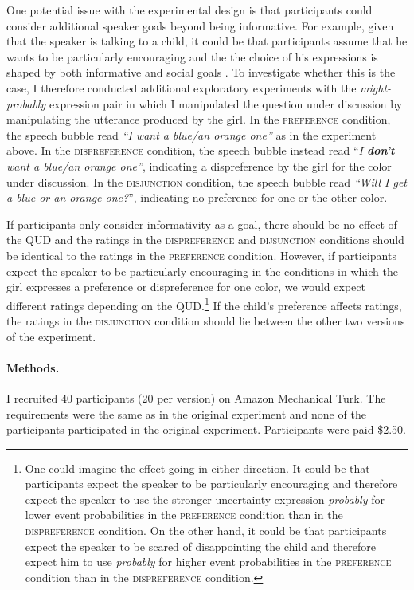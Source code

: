 One potential issue with the experimental design is that participants could consider additional speaker goals
beyond being informative. For example, given that the speaker is talking to a child, it could be that participants
assume that he wants to be particularly encouraging and the the choice of his expressions is shaped by both informative
and social goals \cite{Yoon2019}. To investigate whether this is the case, I therefore conducted additional exploratory experiments with
the \emph{might-probably} expression pair in which I manipulated the question under discussion \cite{QUD; Robers1996} by manipulating 
the utterance produced by the girl. In the \textsc{preference} condition, the speech bubble read \emph{``I want a blue/an orange one''} as in the experiment
above. In the \textsc{dispreference} condition, the speech bubble instead read ``\emph{I \textbf{don't} want a blue/an orange one''}, indicating
a dispreference by the girl for the color under discussion. In the \textsc{disjunction} condition, the speech bubble read 
\emph{``Will I get a blue or an orange one?}'', indicating no preference for one or the other color. 

If participants only consider informativity as a goal, there should be no effect of the QUD and the ratings in the 
\textsc{dispreference} and \textsc{dijsunction} conditions should be identical to the ratings 
in the \textsc{preference} condition. However, if participants expect the speaker to be particularly encouraging in the 
conditions in which the girl expresses a preference or dispreference for one color, we would expect different
ratings depending on the QUD.\footnote{One could imagine the effect going in either direction. It could be that
participants expect the speaker to be particularly encouraging and therefore expect the speaker to use 
the stronger uncertainty expression \textit{probably} for lower event probabilities in the \textsc{preference} condition than 
in the \textsc{dispreference} condition. On the other hand, it could be that participants expect the speaker to be scared 
of disappointing the child and therefore expect him to use \textit{probably} for higher event probabilities in the \textsc{preference} 
condition than in the \textsc{dispreference} condition.} If the child's preference affects ratings, the ratings in the  
\textsc{disjunction} condition should lie between the other two versions of the experiment.

\paragraph{Methods.} I recruited 40 participants (20 per version) on Amazon Mechanical Turk. 
The requirements were the same as in the original experiment and none of the participants 
participated in the original experiment. Participants were paid  \$2.50.

